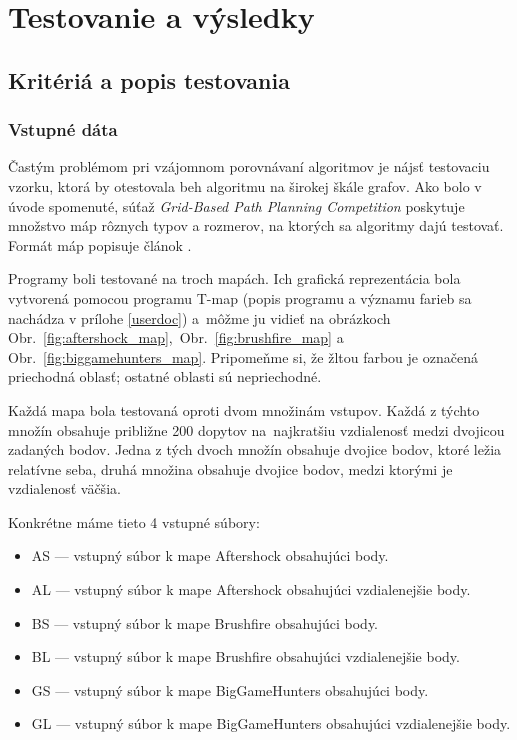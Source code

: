 \chapter{Testovanie a výsledky}

\section{Kritériá a popis testovania}
\subsection{Vstupné dáta}
Častým problémom pri vzájomnom porovnávaní algoritmov je
nájsť testovaciu vzorku, ktorá by otestovala beh algoritmu na širokej škále grafov.
Ako bolo v úvode spomenuté, súťaž {\sl Grid-Based Path Planning Competition} poskytuje množstvo máp rôznych typov a rozmerov,
na ktorých sa algoritmy dajú testovať. Formát máp popisuje článok \cite{sturtevant2012benchmarks}.

Programy boli testované na troch mapách. Ich grafická reprezentácia bola 
vytvorená pomocou programu T-map (popis programu a významu farieb sa nachádza v prílohe \ref{userdoc}) 
a~môžme ju vidieť na obrázkoch Obr.~\ref{fig:aftershock_map},~Obr.~\ref{fig:brushfire_map} a Obr.~\ref{fig:biggamehunters_map}.
Pripomeňme si, že žltou farbou je označená priechodná oblasť; ostatné oblasti sú nepriechodné.

Každá mapa bola testovaná oproti dvom množinám vstupov.
Každá z týchto množín obsahuje približne 200 dopytov
 na~najkratšiu vzdialenosť medzi dvojicou zadaných bodov.
Jedna z tých dvoch množín obsahuje dvojice bodov, ktoré ležia relatívne  seba, druhá množina obsahuje dvojice bodov, medzi ktorými je vzdialenosť väčšia.


Konkrétne máme tieto 4 vstupné súbory:
\begin{itemize}
\item AS --- vstupný súbor k mape Aftershock obsahujúci  body.
\item AL --- vstupný súbor k mape Aftershock obsahujúci vzdialenejšie body.
\item BS --- vstupný súbor k mape Brushfire obsahujúci  body.
\item BL --- vstupný súbor k mape Brushfire obsahujúci vzdialenejšie body.
\item GS --- vstupný súbor k mape BigGameHunters obsahujúci  body.
\item GL --- vstupný súbor k mape BigGameHunters obsahujúci vzdialenejšie body.
\end{itemize}


